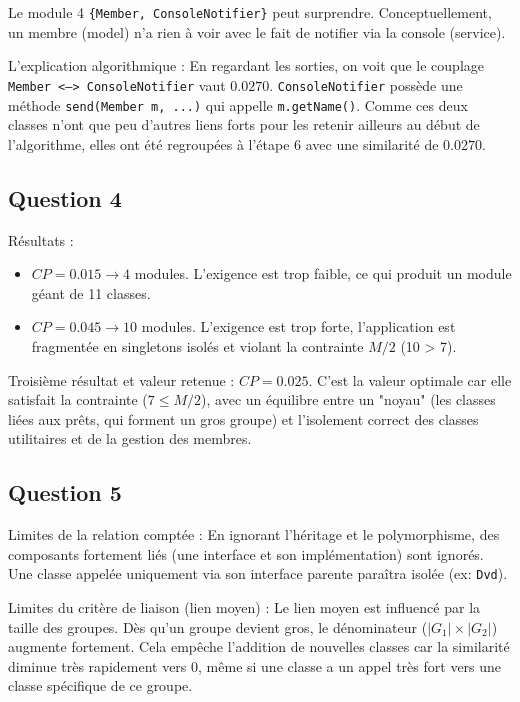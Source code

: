 \documentclass{Templates/customArticle}
\begin{document}
Le module 4 \texttt{\{Member, ConsoleNotifier\}} peut surprendre. Conceptuellement, un membre (model) n'a rien à voir avec le fait de notifier via la console (service).

L'explication algorithmique : En regardant les sorties, on voit que le couplage \texttt{Member <---> ConsoleNotifier} vaut $0.0270$. \texttt{ConsoleNotifier} possède une méthode \texttt{send(Member m, ...)} qui appelle \texttt{m.getName()}. Comme ces deux classes n'ont que peu d'autres liens forts pour les retenir ailleurs au début de l'algorithme, elles ont été regroupées à l'étape 6 avec une similarité de $0.0270$.

\subsection{Question 4}

Résultats :
\begin{itemize}
	\item $CP = 0.015 \rightarrow 4$ modules. L'exigence est trop faible, ce qui produit un module géant de 11 classes.
	\item $CP = 0.045 \rightarrow 10$ modules. L'exigence est trop forte, l'application est fragmentée en singletons isolés et violant la contrainte $M/2$ (10 > 7).
\end{itemize}

Troisième résultat et valeur retenue : $CP = 0.025$.
C'est la valeur optimale car elle satisfait la contrainte ($7 \le M/2$), avec un équilibre entre un "noyau" (les classes liées aux prêts, qui forment un gros groupe) et l'isolement correct des classes utilitaires et de la gestion des membres.

\subsection{Question 5}

Limites de la relation comptée : En ignorant l'héritage et le polymorphisme, des composants fortement liés (une interface et son implémentation) sont ignorés. Une classe appelée uniquement via son interface parente paraîtra isolée (ex: \texttt{Dvd}).

Limites du critère de liaison (lien moyen) : Le lien moyen est influencé par la taille des groupes. Dès qu'un groupe devient gros, le dénominateur ($|G_1| \times |G_2|$) augmente fortement. Cela empêche l'addition de nouvelles classes car la similarité diminue très rapidement vers $0$, même si une classe a un appel très fort vers une classe spécifique de ce groupe.
\end{document}
